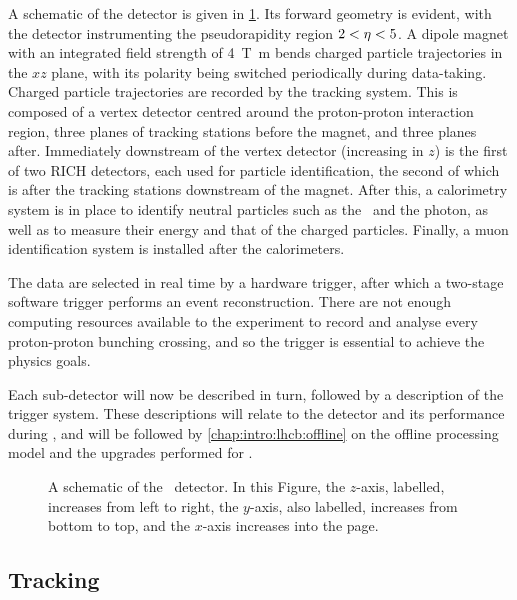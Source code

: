 A schematic of the detector is given in \cref{fig:intro:lhcb:detector}.
Its forward geometry is evident, with the detector instrumenting the 
pseudorapidity region $2 < \eta < 5$.
A dipole magnet with an integrated field strength of \SI{4}{\tesla\metre} bends 
charged particle trajectories in the $xz$ plane, with its polarity being 
switched periodically during data-taking.
Charged particle trajectories are recorded by the tracking system.
This is composed of a vertex detector centred around the proton-proton 
interaction region, three planes of tracking stations before the magnet, and 
three planes after.
Immediately downstream of the vertex detector (increasing in $z$) is the first 
of two \ac{RICH} detectors, each used for particle identification, the second 
of which is after the tracking stations downstream of the magnet.
After this, a calorimetry system is in place to identify neutral particles such 
as the \Ppizero\ and the photon, as well as to measure their energy and that of 
the charged particles.
Finally, a muon identification system is installed after the calorimeters.

The data are selected in real time by a hardware trigger, after which a 
two-stage software trigger performs an event reconstruction.
There are not enough computing resources available to the experiment to record 
and analyse every proton-proton bunching crossing, and so the trigger is 
essential to achieve the physics goals.

Each sub-detector will now be described in turn, followed by a description of 
the trigger system.
These descriptions will relate to the detector and its performance during 
\runone, and will be followed by \cref{chap:intro:lhcb:offline} on the offline 
processing model and the upgrades performed for \runtwo.

\begin{figure}
  \centering
  
  \caption{%
    A schematic of the \lhcb\ detector.
    In this Figure, the $z$-axis, labelled, increases from left to right, the 
    $y$-axis, also labelled, increases from bottom to top, and the $x$-axis 
    increases into the page.
  }
  \label{fig:intro:lhcb:detector}
\end{figure}

\subsection{Tracking}
\label{chap:intro:lhcb:detector:tracking}

